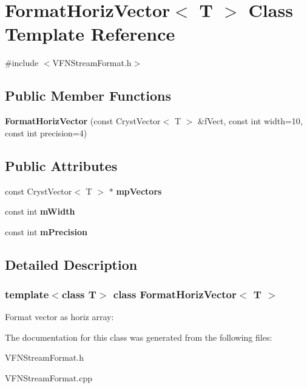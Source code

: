 \hypertarget{class_format_horiz_vector}{}\section{Format\+Horiz\+Vector$<$ T $>$ Class Template Reference}
\label{class_format_horiz_vector}


{\ttfamily \#include $<$V\+F\+N\+Stream\+Format.\+h$>$}

\subsection*{Public Member Functions}
\begin{DoxyCompactItemize}
\item 
\mbox{\label{class_format_horiz_vector_a547a7cbadc52884eb1d0149ab62f6715}} 
{\bfseries Format\+Horiz\+Vector} (const Cryst\+Vector$<$ T $>$ \&f\+Vect, const int width=10, const int precision=4)
\end{DoxyCompactItemize}
\subsection*{Public Attributes}
\begin{DoxyCompactItemize}
\item 
\mbox{\label{class_format_horiz_vector_a73b7421467798780d9c1d67424b3a876}} 
const Cryst\+Vector$<$ T $>$ $\ast$ {\bfseries mp\+Vectors}
\item 
\mbox{\label{class_format_horiz_vector_a3142a01d912b28c5fb2ff261915d80ba}} 
const int {\bfseries m\+Width}
\item 
\mbox{\label{class_format_horiz_vector_ac1ca600c08c0dd17acd9d1d5721d4b57}} 
const int {\bfseries m\+Precision}
\end{DoxyCompactItemize}


\subsection{Detailed Description}
\subsubsection*{template$<$class T$>$\newline
class Format\+Horiz\+Vector$<$ T $>$}

Format vector as horiz array\+:


\begin{DoxyCode}{0}
\end{DoxyCode}
 

The documentation for this class was generated from the following files\+:\begin{DoxyCompactItemize}
\item 
V\+F\+N\+Stream\+Format.\+h\item 
V\+F\+N\+Stream\+Format.\+cpp\end{DoxyCompactItemize}

